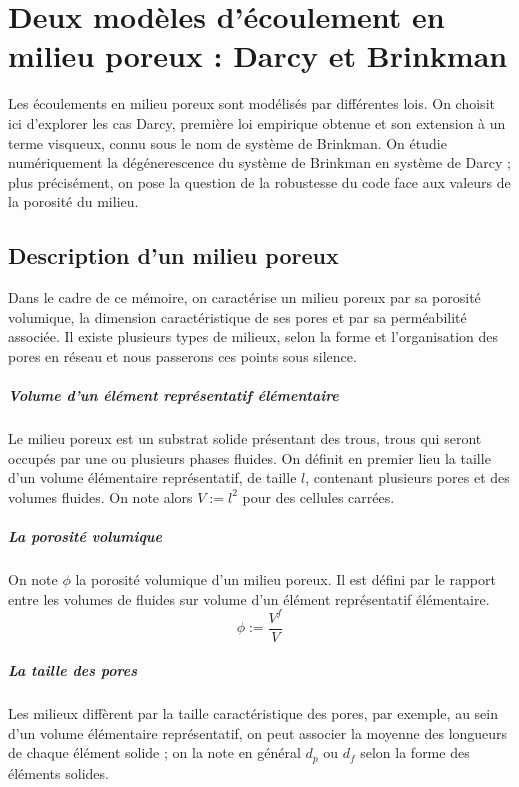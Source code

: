 \chapter{Deux modèles d'écoulement en milieu poreux : Darcy et Brinkman}

\noindent Les écoulements en milieu poreux sont modélisés par différentes lois. On choisit ici d'explorer les cas Darcy, première loi empirique obtenue et son extension à un terme visqueux, connu sous le nom de système de Brinkman. On étudie numériquement la dégénerescence du système de Brinkman en système de Darcy ; plus précisément, on pose la question de la robustesse du code face aux valeurs de la porosité du milieu.

\section{Description d'un milieu poreux}

Dans le cadre de ce mémoire, on caractérise un milieu poreux par sa porosité volumique, la dimension caractéristique de ses pores et par sa perméabilité associée. Il existe plusieurs types de milieux, selon la forme et l'organisation des pores en réseau et nous passerons ces points sous silence.

\paragraph{Volume d'un élément représentatif élémentaire} Le milieu poreux est un substrat solide présentant des trous, trous qui seront occupés par une ou plusieurs phases fluides. On définit en premier lieu la taille d'un volume élémentaire représentatif, de taille $l$, contenant plusieurs pores et des volumes fluides. On note alors $V := l^2$ pour des cellules carrées.

\paragraph{La porosité volumique} On note $\phi$ la porosité volumique d'un milieu poreux. Il est défini par le rapport entre les volumes de fluides sur volume d'un élément représentatif élémentaire. $$ \phi := \frac{V^f}{V} $$

\paragraph{La taille des pores} Les milieux diffèrent par la taille caractéristique des pores, par exemple, au sein d'un volume élémentaire représentatif, on peut associer la moyenne des longueurs de chaque élément solide ; on la note en général $d_p$ ou $d_f$ selon la forme des éléments solides.

